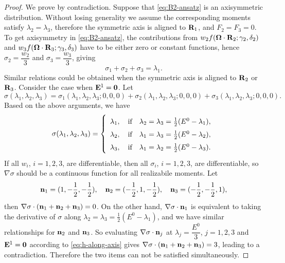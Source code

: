 \begin{proof}
  We prove by contradiction. Suppose that \eqref{eq:B2-ansatz} is an
  axisymmetric distribution. Without losing generality we assume the
  corresponding moments satisfy $\lambda_2 = \lambda_3$, therefore the
  symmetric axis is aligned to $\mathbf{R}_1$, and $F_2 = F_3 = 0$. To get
  axisymmetry in \eqref{eq:B2-ansatz}, the contributions from
  $w_2 f(\boldsymbol{\Omega}\cdot\mathbf{R}_2;\gamma_2,\delta_2)$ and
  $w_3 f(\boldsymbol{\Omega}\cdot\mathbf{R}_3;\gamma_3,\delta_3)$ have to be either zero
  or constant functions, hence $\sigma_2 = \dfrac{w_2}{3}$ and
  $\sigma_3 = \dfrac{w_3}{3}$, giving
  \[
  \sigma_1 + \sigma_2 + \sigma_3 = \lambda_1.
  \]
  Similar relations could be obtained when the symmetric 
  axis is aligned to $\mathbf{R}_2$ or $\mathbf{R}_3$.
  Consider the case when $\mathbf{E}^1 = \boldsymbol{0}$. 
  Let 
  \[
  \sigma(\lambda_1,\lambda_2,\lambda_3) = 
  \sigma_1(\lambda_1,\lambda_2,\lambda_3;0,0,0)
  + \sigma_2(\lambda_1,\lambda_2,\lambda_3;0,0,0)
  + \sigma_3(\lambda_1,\lambda_2,\lambda_3;0,0,0).
  \]
  Based on the above arguments, we have
  \begin{equation}\label{eq:h-along-axis}
    \renewcommand\arraystretch{1.5}
    \sigma(\lambda_1,\lambda_2,\lambda_3) = \left \{
      \begin{array}{l}
        \lambda_1,\quad\text{if}\quad \lambda_2 = \lambda_3 
        = \frac12(E^0-\lambda_1),\\
        \lambda_2,\quad\text{if}\quad \lambda_1 = \lambda_3
        = \frac12(E^0-\lambda_2),\\
        \lambda_3,\quad\text{if}\quad \lambda_1 = \lambda_2
        = \frac12(E^0-\lambda_3).
      \end{array}\right.
  \end{equation}
  If all $w_i$, $i=1,2,3$, are differentiable, then all
  $\sigma_i$, $i=1,2,3$, are differentiable, so $\nabla \sigma$
  should be a continuous function for all realizabile
  moments. Let
  \[
  \mathbf{n}_1 = (1, -\frac12, -\frac12),\quad
  \mathbf{n}_2 = (-\frac12, 1, -\frac12),\quad
  \mathbf{n}_3 = (-\frac12, -\frac12, 1),
  \]
  then $\nabla \sigma \cdot(\mathbf{n}_1 + \mathbf{n}_2 + \mathbf{n}_3) = 0$. On the other
  hand, $\nabla \sigma \cdot\mathbf{n}_1$ is equivalent to taking the
  derivative of $\sigma$ along
  $\lambda_2 = \lambda_3 = \frac12(E^0-\lambda_1)$, and we have
  similar relationships for $\mathbf{n}_2$ and $\mathbf{n}_3$.  So evaluating
  $\nabla \sigma \cdot\mathbf{n}_j$ at $\lambda_j = \dfrac{E^0}{3}$,
  $j=1,2,3$ and $\mathbf{E}^1 = \boldsymbol{0}$ according to
  \eqref{eq:h-along-axis} gives
  $\nabla \sigma \cdot(\mathbf{n}_1 + \mathbf{n}_2 + \mathbf{n}_3) = 3$, leading to a
  contradiction. Therefore the two items can not be satisfied
  simultaneously.
\end{proof}
